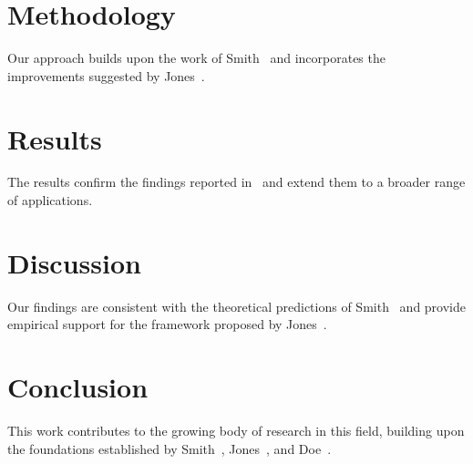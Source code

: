 \documentclass{article}
\begin{document}
\section{Methodology}
Our approach builds upon the work of Smith~\cite{smith2023} and incorporates the improvements suggested by Jones~\cite{jones2022}.

\section{Results}
The results confirm the findings reported in~\cite{doe2023} and extend them to a broader range of applications.

\section{Discussion}
Our findings are consistent with the theoretical predictions of Smith~\cite{smith2023} and provide empirical support for the framework proposed by Jones~\cite{jones2022}.

\section{Conclusion}
This work contributes to the growing body of research in this field, building upon the foundations established by Smith~\cite{smith2023}, Jones~\cite{jones2022}, and Doe~\cite{doe2023}.

\printbibliography
\end{document}
